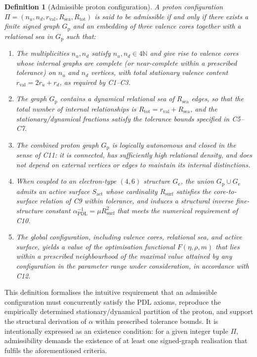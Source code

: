 \documentclass[11pt,a4paper]{article}
\newtheorem{definition}{Definition}
\begin{document}
\begin{definition}[Admissible proton configuration]
A proton configuration $\Pi=(n_u,n_d,r_{\mathrm{val}},R_{\mathrm{sea}},R_{\mathrm{tot}})$ is said to be admissible if and only if there exists a finite signed graph $G_{\mathrm{p}}$ and an embedding of three valence cores together with a relational sea in $G_{\mathrm{p}}$ such that:
\begin{enumerate}[label=(A\arabic*)]
\item The multiplicities $n_u,n_d$ satisfy $n_u,n_d\in 4\mathbb{N}$ and give rise to valence cores whose internal graphs are complete (or near-complete within a prescribed tolerance) on $n_u$ and $n_d$ vertices, with total stationary valence content $r_{\mathrm{val}}=2r_u+r_d$, as required by C1–C3.
\item The graph $G_{\mathrm{p}}$ contains a dynamical relational sea of $R_{\mathrm{sea}}$ edges, so that the total number of internal relationships is $R_{\mathrm{tot}}=r_{\mathrm{val}}+R_{\mathrm{sea}}$, and the stationary/dynamical fractions satisfy the tolerance bounds specified in C5–C7.
\item The combined proton graph $G_{\mathrm{p}}$ is logically autonomous and closed in the sense of C11: it is connected, has sufficiently high relational density, and does not depend on external vertices or edges to maintain its internal distinctions.
\item When coupled to an electron-type $(4,6)$ structure $G_{\mathrm{e}}$, the union $G_{\mathrm{p}}\cup G_{\mathrm{e}}$ admits an active surface $S_{\mathrm{act}}$ whose cardinality $R_{\mathrm{surf}}$ satisfies the core-to-surface relation of C9 within tolerance, and induces a structural inverse fine-structure constant $\alpha_{\mathrm{PDL}}^{-1}=\mu R_{\mathrm{surf}}^{2}$ that meets the numerical requirement of C10.
\item The global configuration, including valence cores, relational sea, and active surface, yields a value of the optimisation functional $F(\eta,\rho,m)$ that lies within a prescribed neighbourhood of the maximal value attained by any configuration in the parameter range under consideration, in accordance with C12.
\end{enumerate}
\end{definition}

This definition formalises the intuitive requirement that an admissible configuration must concurrently satisfy the PDL axioms, reproduce the empirically determined stationary/dynamical partition of the proton, and support the structural derivation of $\alpha$ within prescribed tolerance bounds. It is intentionally expressed as an existence condition: for a given integer tuple $\Pi$, admissibility demands the existence of at least one signed-graph realisation that fulfils the aforementioned criteria.
\end{document}
